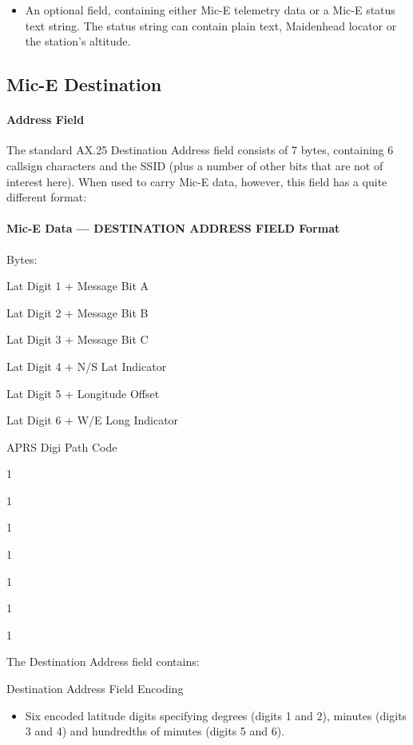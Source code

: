 {{{{{\begin{itemize}
\item An optional field, containing either Mic-E telemetry data or a Mic-E
status text string. The status string can contain plain text, Maidenhead
locator or the station’s altitude.

\end{itemize}

\subsection{Mic-E Destination}
\paragraph {Address Field}

The standard AX.25 Destination Address field consists of 7 bytes, containing
6 callsign characters and the SSID (plus a number of other bits that are not of
interest here). When used to carry Mic-E data, however, this field has a quite
different format:

\paragraph {Mic-E Data — DESTINATION ADDRESS FIELD Format}

Bytes:

Lat Digit 1
+ Message
Bit A

Lat Digit 2
+ Message
Bit B

Lat Digit 3
+ Message
Bit C

Lat Digit 4
+ N/S Lat
Indicator

Lat Digit 5
+ Longitude
Offset

Lat Digit 6
+ W/E Long
Indicator

APRS
Digi Path
Code

1

1

1

1

1

1

1

The Destination Address field contains:


  
Destination
Address Field
Encoding

\begin{itemize}

\item Six encoded latitude digits specifying degrees (digits 1 and 2), minutes
(digits 3 and 4) and hundredths of minutes (digits 5 and 6).


\end{itemize}}}}}}
